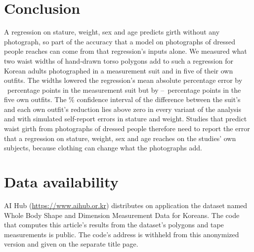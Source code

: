 \documentclass[12pt]{article}
\begin{document}
\section{Conclusion}\label{sec:conclusion}

A regression on stature, weight, sex and age predicts girth without any photograph, so part of the accuracy that a model on photographs of dressed people reaches can come from that regression's inputs alone. We measured what two waist widths of
hand-drawn torso polygons add to such a regression for Korean adults photographed in a measurement suit and in five
of their own outfits. The widths lowered the regression's mean absolute percentage error by \redSuit\ percentage
points in the measurement suit but by \redOwnMin--\redOwnMax\ percentage points in the five own outfits. The
\ciLevel\% confidence interval of the difference between the suit's and each own outfit's reduction lies above zero in
every variant of the analysis and with simulated self-report errors in stature and weight. Studies that predict waist girth from photographs of dressed people therefore need to report the error that a regression on stature, weight, sex and age
reaches on the studies' own subjects, because clothing can change what the photographs add.

\section*{Data availability}

AI Hub (\url{https://www.aihub.or.kr}) distributes on application the dataset named Whole Body Shape and Dimension
Measurement Data for Koreans. The code that computes this article's results from the dataset's polygons and tape
measurements is public. The code's address is withheld from this anonymized version and given on the separate title page.



\end{document}
